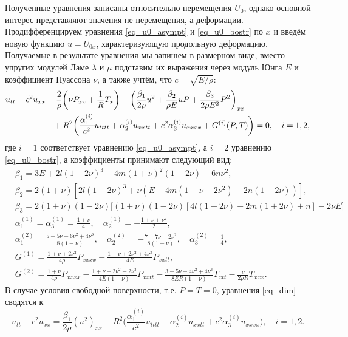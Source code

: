 \documentclass[12pt, a4paper]{article}
\begin{document}
Полученные уравнения записаны относительно перемещения $U_0$, однако основной интерес представляют значения не перемещения, а деформации. Продифференцируем уравнения \eqref{eq_u0_asympt} и \eqref{eq_u0_bostr} по $x$ и введём новую функцию $u = U_{0x}$, характеризующую продольную деформацию. Получаемые в результате уравнения мы запишем в размерном виде, вместо упругих модулей Ламе $\lambda$ и $\mu$ подставим их выражения через модуль Юнга $E$ и коэффициент Пуассона $\nu$, а также учтём, что $c=\sqrt{E/\rho}$:
\begin{equation}\label{eq_dim}
\begin{split}
&u_{tt} - c^2 u_{xx} - \frac{2}{\rho}\bigg(\nu P_{xx} + \frac1R T_x\bigg) - \left(\frac{\beta_1}{2\rho} u^2 + \frac{\beta_2}{\rho E} u P + \frac{\beta_3}{2\rho E^2} P^2\right)_{xx}\\
&\hspace{20mm} + R^2 \bigg(\frac{\alpha_1^{(i)}}{c^2} u_{tttt} + \alpha_2^{(i)} u_{xxtt} + c^2\alpha_3^{(i)} u_{xxxx} + G^{(i)}(P, T) \bigg) = 0, \quad i = 1,2,
\end{split}
\end{equation}
где $i=1$ соответствует уравнению \eqref{eq_u0_asympt}, а $i=2$ уравнению \eqref{eq_u0_bostr}, а коэффициенты принимают следующий вид:
\begin{align}
\label{beta_1}
&\beta_1 = 3E + 2l(1 - 2\nu)^3 + 4m(1 + \nu)^2 (1 - 2\nu) + 6n\nu^2,\\
\label{beta_2}
&\beta_2 = 2 (1 + \nu) \left[2 l (1 - 2 \nu)^3 + \nu \left(E + 4m \left(1 - \nu - 2\nu^2\right) - 2n (1 - 2\nu)\right) \right],\\
\label{beta_3}
&\beta_3 = 2(1 + \nu)(1 - 2 \nu) \Big[ (1 + \nu)(1 - 2\nu) [4l \left(1 - 2\nu\right) - 2m(1 + 2\nu) + n] - 2\nu E \Big]\\
\label{alpha_1}
&\alpha_1^{(1)} = \alpha_3^{(1)} = \frac{1 + \nu}{4}, \quad \alpha_2^{(1)} = -\frac{1 + \nu + \nu^2}{2}, \\
\label{alpha_2}
&\alpha_1^{(2)} = \frac{5 - 5\nu - 6\nu^2 + 4\nu^3}{8(1-\nu)},\quad \alpha_2^{(2)} = -\frac{7 - 7\nu - 2\nu^2}{8(1-\nu)}, \quad \alpha_3^{(2)} = \frac14,\\
\label{G1}
&G^{(1)} = \frac{1 + \nu + 2\nu^2}{4\rho} P_{xxxx} - \frac{1 - \nu + 2\nu^2 + 4\nu^3}{4E} P_{xxtt},\\
\label{G2}
&G^{(2)} = \frac{1 + \nu}{4\rho} P_{xxxx} - \frac{1 + \nu - 2\nu^2 - 2\nu^3}{4E(1 - \nu)} P_{xxtt} - \frac{3 - 5\nu - 4\nu^2 + 4\nu^3}{8ER(1 - \nu)} T_{xtt} - \frac{\nu}{2\rho R} T_{xxx}.
\end{align}
В случае условия свободной поверхности, т.е. $P = T = 0$, уравнения \eqref{eq_dim} сводятся к
\begin{equation}\label{eq_dim_free_surf}
u_{tt} - c^2 u_{xx} = \frac{\beta_1}{2\rho}\left(u^2\right)_{xx} -  R^2 \bigg(\frac{\alpha_1^{(i)}}{c^2} u_{tttt} + \alpha_2^{(i)} u_{xxtt} + c^2\alpha_3^{(i)} u_{xxxx}\bigg), \quad i = 1,2.
\end{equation}
\end{document}
